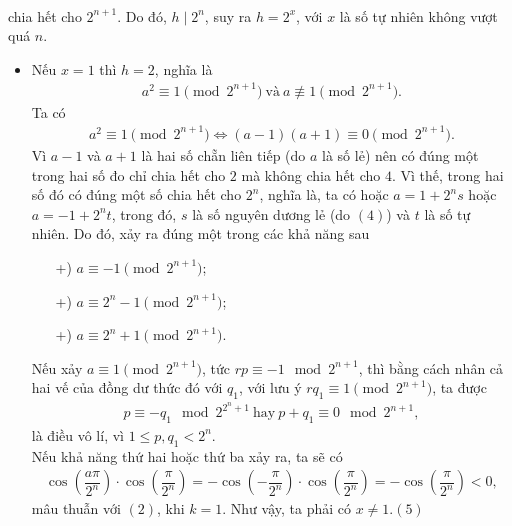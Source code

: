 \begin{bt}
{\begin{align*}
		\end{align*}
		chia hết cho $2^{n+1}$. Do đó, $h\mid 2^{n}$, suy ra $h=2^x$, với $x$ là số tự nhiên không vượt quá $n$.
		\begin{itemize}
			\item Nếu $x=1$ thì $h=2$, nghĩa là
			\begin{align*}
			a^2\equiv 1 \pmod{2^{n+1}}\ \text{và}\ a\not\equiv 1\pmod{2^{n+1}}. \tag{4}
			\end{align*}
			Ta có
			{
				\allowdisplaybreaks
				\begin{align*}
				a^2\equiv 1 \pmod{2^{n+1}} \Leftrightarrow (a-1)(a+1) \equiv 0 \pmod{2^{n+1}}.
				\end{align*}
			}
			Vì $a-1$ và $a+1$ là hai số chẵn liên tiếp (do $a$ là số lẻ) nên có đúng một trong hai số đo chỉ chia hết cho $2$ mà không chia hết cho $4$. Vì thế, trong hai số đó có đúng một số chia hết cho $2^n$, nghĩa là, ta có hoặc $a=1+2^ns$ hoặc $a=-1+2^nt$, trong đó, $s$ là số nguyên dương lẻ (do $(4)$) và $t$ là số tự nhiên. Do đó, xảy ra đúng một trong các khả năng sau
			\begin{itemize}
				\item[+)] $a\equiv -1\pmod{2^{n+1}}$;
				\item[+)] $a\equiv 2^n-1\pmod{2^{n+1}}$;
				\item[+)] $a\equiv 2^n+1\pmod{2^{n+1}}$.
			\end{itemize}
			Nếu xảy $a\equiv 1\pmod{2^{n+1}}$, tức $rp\equiv -1 \mod{2^{n+1}}$, thì bằng cách nhân cả hai vế của đồng dư thức đó với $q_1$, với lưu ý $rq_1\equiv 1\pmod{2^{n+1}}$, ta được
			\begin{align*}
			p\equiv -q_1 \mod{2^{2^n+1}}\ \text{hay}\ p+q_1\equiv 0 \mod{2^{n+1}},
			\end{align*}
			là điều vô lí, vì $1\le p,q_1<2^n$.\\
			Nếu khả năng thứ hai hoặc thứ ba xảy ra, ta sẽ có
			\begin{align*}
			\cos\left( \dfrac{a\pi}{2^n} \right)\cdot \cos\left( \dfrac{\pi}{2^n} \right)=-\cos\left( -\dfrac{\pi}{2^n} \right)\cdot \cos\left( \dfrac{\pi}{2^n} \right)=-\cos\left( \dfrac{\pi}{2^n} \right)<0,
			\end{align*}
			mâu thuẫn với $(2)$, khi $k=1$. Như vậy, ta phải có $x\ne 1$.\hfill $(5)$
			

\end{itemize}}
\end{bt}
